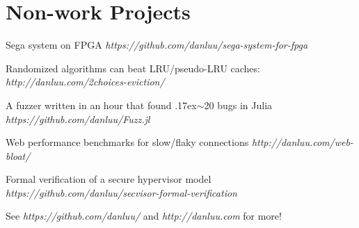 \documentclass[letterpaper]{scrartcl}
\begin{document}
\section*{Non-work Projects}
\begin{list1}
\item
  \begin{list2}
    \item Sega system on FPGA \hfill \emph{https://github.com/danluu/sega-system-for-fpga}
    \item Randomized algorithms can beat LRU/pseudo-LRU caches:  \hfill \emph{http://danluu.com/2choices-eviction/}
    \item A fuzzer written in an hour that found {\raise.17ex\hbox{$\scriptstyle\mathtt{\sim}$}}20 bugs in Julia \hfill \emph{https://github.com/danluu/Fuzz.jl}
    \item Web performance benchmarks for slow/flaky connections \hfill \emph{http://danluu.com/web-bloat/}
    \item Formal verification of a secure hypervisor model \hfill \emph{https://github.com/danluu/secvisor-formal-verification}
    \item See \emph{https://github.com/danluu/} and \emph{http://danluu.com} for more!
  \end{list2}
\end{list1}


%
%
\end{document}
